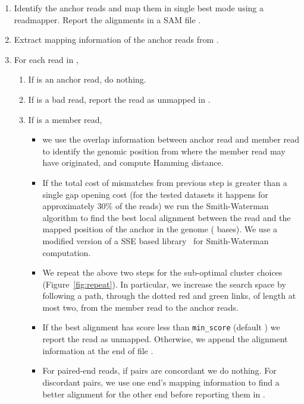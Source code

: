 \documentclass[a4paper]{article}
\begin{document}
\begin{enumerate}
\setlength{\itemsep}{1pt}
  \setlength{\parskip}{0pt}
  \setlength{\parsep}{0pt}
\item Identify the anchor reads and map them in single best mode using
a readmapper. Report the alignments in a SAM file .
\item Extract mapping information of the anchor reads from .
\item For each read  in ,
  \begin{enumerate}
  \setlength{\itemsep}{1pt}
  \setlength{\parskip}{0pt}
  \setlength{\parsep}{0pt}
  \item If  is an anchor read, do nothing.
  \item If  is a bad read, report the read as unmapped in .
  \item If  is a member read,
	\begin{itemize}
	\item we use the overlap information between anchor read and member
	read to identify the genomic position from where
	the member read may have originated, and compute Hamming distance.
	\item If the total cost of mismatches from previous step is greater
	than a single gap opening
	cost (for the tested datasets it happens for approximately 30\% of the reads)
	we run the Smith-Waterman
    algorithm \cite{Smith1981195} to find the best local alignment
    between the read and the mapped position of the anchor in the genome
    ( bases). We use a modified version of a SSE based library~\cite{Beneke:1997hv} for Smith-Waterman computation.
    \item We repeat the above two steps for the sub-optimal cluster
    choices (Figure~\ref{fig:repeat}). In particular, we increase the search
    space by following a path, through the dotted red and green links, of length at most two,
    from the member read to the anchor reads.
	\item If the best alignment has score less than {\tt min\_score}
	(default ) we report the read as
    unmapped. Otherwise, we append the alignment information at the
    end of file .
    \item For paired-end reads, if pairs are concordant we do nothing.
    For discordant pairs, we use one end's mapping information to find
    a better alignment for the other end before reporting them in .
    \end{itemize}
  \end{enumerate}
\end{enumerate}
\end{document}
